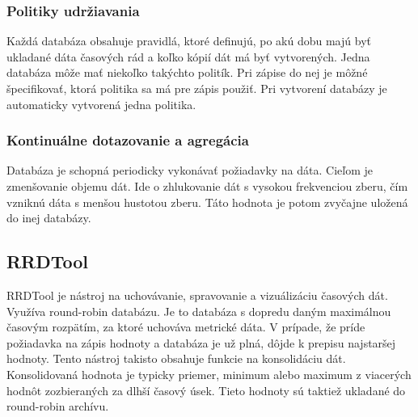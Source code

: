 \documentclass[printed,11pt,twoside,color,cover,table]{fithesis3}
\begin{document}
\subsubsection{Politiky udržiavania}
Každá databáza obsahuje pravidlá, ktoré definujú, po akú dobu majú byť ukladané dáta časových rád a koľko kópií dát má byť vytvorených. Jedna databáza môže mať niekoľko takýchto politík. Pri zápise 
do nej je môžné špecifikovať, ktorá politika sa má pre zápis použiť. Pri vytvorení databázy je automaticky vytvorená jedna politika.

\subsubsection{Kontinuálne dotazovanie a agregácia}
Databáza je schopná periodicky vykonávať požiadavky na dáta. Cieľom je zmenšovanie objemu dát. Ide o zhlukovanie dát s vysokou frekvenciou zberu, čím vzniknú dáta s menšou hustotou zberu. Táto hodnota je 
potom zvyčajne uložená do inej databázy.

\subsection{RRDTool}
RRDTool je nástroj na uchovávanie, spravovanie a vizuálizáciu časových dát. Využíva round-robin databázu. Je to databáza s dopredu daným maximálnou časovým rozpätím, za ktoré uchováva metrické dáta.
V prípade, že príde požiadavka na zápis hodnoty a databáza je už plná, dôjde k prepisu najstaršej hodnoty. Tento nástroj takisto obsahuje funkcie na konsolidáciu dát. 
Konsolidovaná hodnota je typicky priemer, minimum alebo maximum z viacerých hodnôt zozbieraných za dlhší časový úsek. Tieto hodnoty sú taktiež ukladané do round-robin archívu.
\end{document}
